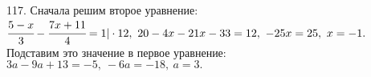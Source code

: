 117. Сначала решим второе уравнение: $\cfrac{5-x}{3}-\cfrac{7x+11}{4}=1|\cdot12,\ 20-4x-21x-33=12,\ -25x=25,\ x=-1.$ Подставим это значение в первое уравнение:
$3a-9a+13=-5,\ -6a=-18,\ a=3.$
\newpage

